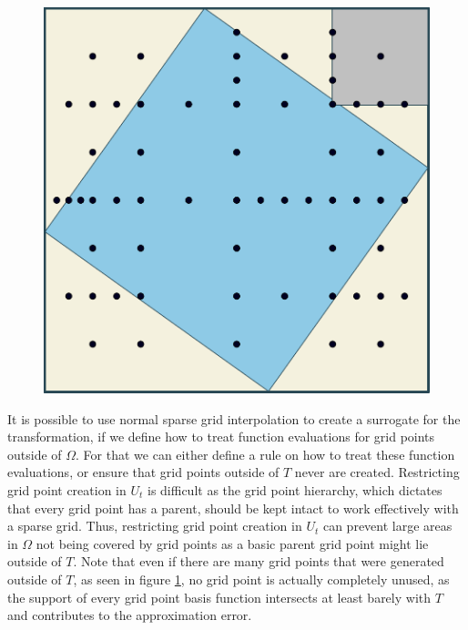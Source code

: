 \documentclass[
  a4paper,  %
  twoside,  %
  bibliography=totoc,
  headsepline,
  cleardoublepage=empty,
  parskip=half,
  draft=false
]{scrbook}
\begin{document}
\begin{mdframed}[style=style]
\begin{figure}[H]
        \centering
\begin{minipage}{.49\textwidth}
        \centering
\label{fig:aligned_grid}
    \end{minipage}%
    \begin{minipage}{0.49\textwidth}
        \centering
   \includegraphics[width=0.8\linewidth]{graphics/aligned_grid}
    \end{minipage}
\end{figure}
\end{mdframed}

It is possible to use normal sparse grid interpolation to create a surrogate for the transformation, if we define how to treat function evaluations for grid points outside of $\Omega$.
For that we can either define a rule on how to treat these function evaluations, or ensure that grid points outside of $T$ never are created.
Restricting grid point creation in $U_t$ is difficult as the grid point hierarchy, which dictates that every grid point has a parent, should be kept intact to work effectively with a sparse grid.
Thus, restricting grid point creation in $U_t$ can prevent large areas in $\Omega$ not being covered by grid points as a basic parent grid point might lie outside of $T$.
Note that even if there are many grid points that were generated outside of $T$, as seen in figure \cref{fig:aligned_grid}, no grid point is actually completely unused, as the support of every grid point basis function intersects at least barely with $T$ and contributes to the approximation error.
\end{document}
